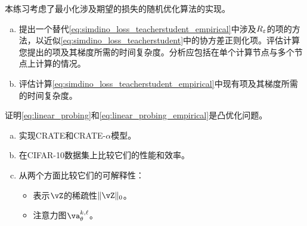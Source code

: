 \documentclass[../../book-main.tex]{subfiles}
\begin{document}
\begin{exercise}
    本练习考虑了最小化涉及期望的损失的随机优化算法的实现。
    \begin{enumerate}[(a)]
        \item 提出一个替代\eqref{eq:simdino_loss_teacherstudent_empirical}中涉及\(R_{\varepsilon}\)的项的方法，以近似\eqref{eq:simdino_loss_teacherstudent}中的协方差正则化项。评估计算您提出的项及其梯度所需的时间复杂度。分析应包括在单个计算节点与多个节点上计算的情况。
        \item  评估计算\eqref{eq:simdino_loss_teacherstudent_empirical}中现有项及其梯度所需的时间复杂度。
    \end{enumerate}
\end{exercise}

\begin{exercise}
    证明\eqref{eq:linear_probing}和\eqref{eq:linear_probing_empirical}是凸优化问题。
\end{exercise}

\begin{exercise}
    \phantom{}
    \begin{enumerate}[(a)]
        \item 实现CRATE和CRATE-\(\alpha\)模型。
        \item 在CIFAR-10数据集上比较它们的性能和效率。
        \item 从两个方面比较它们的可解释性：
        \begin{itemize}
            \item 表示\(\vZ\)的稀疏性\(\norm{\vZ}_{0}\)。
            \item 注意力图\(\va_{\theta}^{k, \ell}\)。
        \end{itemize}
    \end{enumerate}
\end{exercise}
\end{document}
